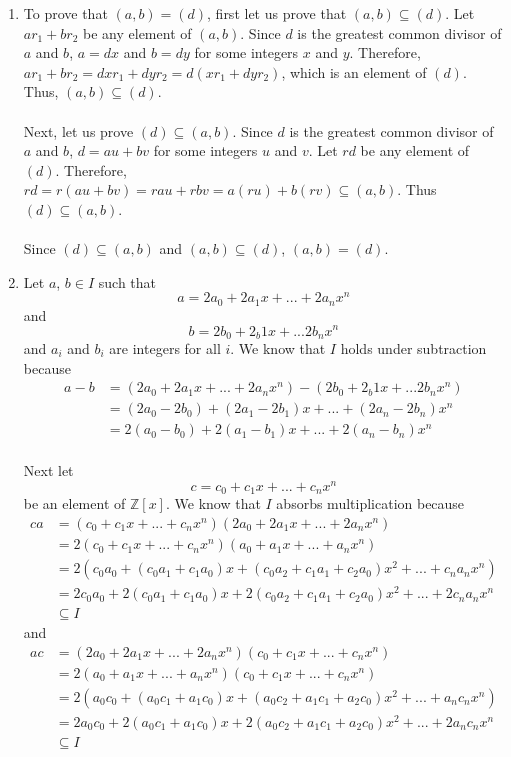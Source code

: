 \documentclass{article}
\begin{document}
\begin{enumerate}
\item To prove that $(a,b) = (d)$, first let us prove that $(a,b) \subseteq (d)$.
Let $ar_1 + br_2$ be any element of $(a,b)$.  Since $d$ is the greatest common
divisor of $a$ and $b$, $a = dx$ and $b = dy$ for some integers $x$ and $y$.
Therefore, $ar_1 + br_2 = dxr_1 + dyr_2 = d(xr_{1} + dyr_{2})$, which is an
element of $(d)$.  Thus, $(a,b) \subseteq (d)$. \\ \\
Next, let us prove $(d) \subseteq (a,b)$.  Since $d$ is the greatest common
divisor of $a$ and $b$, $d = au + bv$ for some integers $u$ and $v$.  Let
$rd$ be any element of $(d)$.
Therefore, $rd = r(au + bv) = rau + rbv = a(ru) + b(rv) \subseteq (a,b)$.
Thus $(d) \subseteq (a,b)$. \\ \\
Since $(d) \subseteq (a,b)$ and $(a,b) \subseteq (d)$, $(a,b) = (d)$.

\item
Let $a$, $b \in I$ such that
\[a = 2a_0 + 2a_{1}x + ... + 2a_{n}x^n
\]
and
\[b = 2b_0 + 2_b{1}x + ... 2b_{n}x^n
\]
and $a_i$ and $b_i$ are integers for all
$i$.  We know that $I$ holds under subtraction because
\begin{align*}
a - b &= (2a_0 + 2a_{1}x + ... + 2a_{n}x^{n}) - (2b_0 + 2_b{1}x + ... 2b_{n}x^n) \\
&= (2a_0 - 2b_0) + (2a_{1} - 2b_{1})x + ... + (2a_{n} - 2b_{n})x^n \\
&= 2(a_0 - b_0) + 2(a_{1} - b_{1})x + ... + 2(a_{n} - b_{n})x^n \\
\end{align*}

Next let
\[
c = c_0 + c_{1}x + ... + c_{n}x^n
\]
be an element of $\mathbb{Z}[x]$.
We know that $I$ absorbs multiplication because
\begin{align*}
ca &= (c_0 + c_{1}x + ... + c_{n}x^{n})(2a_0 + 2a_{1}x + ...+ 2a_{n}x^{n}) \\
&= 2(c_0 + c_{1}x + ... + c_{n}x^{n})(a_0 + a_{1}x + ... + a_{n}x^{n}) \\
&= 2(c_{0}a_{0} + (c_{0}a_{1} + c_{1}a_{0})x + (c_{0}a_{2} + c_{1}a_{1} + c_{2}a_{0})x^{2}
+ ... + c_{n}a_{n}x^{n}) \\
&= 2c_{0}a_{0} + 2(c_{0}a_{1} + c_{1}a_{0})x + 2(c_{0}a_{2} + c_{1}a_{1} + c_{2}a_{0})x^{2}
+ ... + 2c_{n}a_{n}x^{n} \\
&\subseteq I
\end{align*}
and
\begin{align*}
ac &= (2a_0 + 2a_{1}x + ...+ 2a_{n}x^{n})(c_0 + c_{1}x + ... + c_{n}x^{n}) \\
&= 2(a_0 + a_{1}x + ... + a_{n}x^{n})(c_0 + c_{1}x + ... + c_{n}x^{n}) \\
&= 2(a_{0}c_{0} + (a_{0}c_{1} + a_{1}c_{0})x + (a_{0}c_{2} + a_{1}c_{1} + a_{2}c_{0})x^{2}
+ ... + a_{n}c_{n}x^{n}) \\
&= 2a_{0}c_{0} + 2(a_{0}c_{1} + a_{1}c_{0})x + 2(a_{0}c_{2} + a_{1}c_{1} + a_{2}c_{0})x^{2}
+ ... + 2a_{n}c_{n}x^{n} \\
&\subseteq I
\end{align*}


\end{enumerate}
\end{document}

